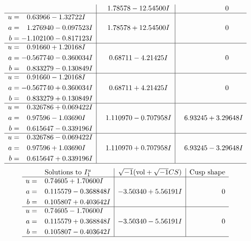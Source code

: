 \documentclass[1p]{elsarticle_modified}
\theoremstyle{definition}
\newcommand{\I}{\sqrt{-1}}
\begin{document}
$$\begin{array}{c|c|c}
 & \phantom{-}1.78578 - 12.54500 I & \phantom{-0.000000 } 0 \\ \hline\begin{aligned}
u &= \phantom{-}0.63966 - 1.32722 I \\
a &= \phantom{-}1.276940 - 0.097523 I \\
b &= -1.102100 - 0.817123 I\end{aligned}
 & \phantom{-}1.78578 + 12.54500 I & \phantom{-0.000000 } 0 \\ \hline\begin{aligned}
u &= \phantom{-}0.91660 + 1.20168 I \\
a &= -0.567740 - 0.360034 I \\
b &= \phantom{-}0.833279 - 0.130849 I\end{aligned}
 & \phantom{-}0.68711 - 4.21425 I & \phantom{-0.000000 } 0 \\ \hline\begin{aligned}
u &= \phantom{-}0.91660 - 1.20168 I \\
a &= -0.567740 + 0.360034 I \\
b &= \phantom{-}0.833279 + 0.130849 I\end{aligned}
 & \phantom{-}0.68711 + 4.21425 I & \phantom{-0.000000 } 0 \\ \hline\begin{aligned}
u &= \phantom{-}0.326786 + 0.069422 I \\
a &= \phantom{-}0.97596 - 1.03690 I \\
b &= \phantom{-}0.615647 - 0.339196 I\end{aligned}
 & \phantom{-}1.110970 - 0.707958 I & \phantom{-}6.93245 + 3.29648 I \\ \hline\begin{aligned}
u &= \phantom{-}0.326786 - 0.069422 I \\
a &= \phantom{-}0.97596 + 1.03690 I \\
b &= \phantom{-}0.615647 + 0.339196 I\end{aligned}
 & \phantom{-}1.110970 + 0.707958 I & \phantom{-}6.93245 - 3.29648 I\\
 \hline 
 \end{array}$$\newpage$$\begin{array}{c|c|c}  
\text{Solutions to }I^u_{1}& \I (\text{vol} + \sqrt{-1}CS) & \text{Cusp shape}\\
 \hline 
\begin{aligned}
u &= \phantom{-}0.74605 + 1.70600 I \\
a &= \phantom{-}0.115579 - 0.368848 I \\
b &= \phantom{-}0.105807 + 0.403642 I\end{aligned}
 & -3.50340 + 5.56191 I & \phantom{-0.000000 } 0 \\ \hline\begin{aligned}
u &= \phantom{-}0.74605 - 1.70600 I \\
a &= \phantom{-}0.115579 + 0.368848 I \\
b &= \phantom{-}0.105807 - 0.403642 I\end{aligned}
 & -3.50340 - 5.56191 I & \phantom{-0.000000 } 0\\
 \hline 
 \end{array}$$\newpage\newpage\renewcommand{\arraystretch}{1}
\end{document}
